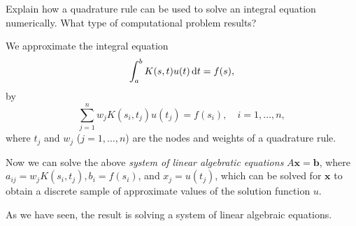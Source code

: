 \begin{pro}
  Explain how a quadrature rule can be used
  to solve an integral equation numerically.
  What type of computational problem results?
\end{pro}

\begin{sol}
  We approximate the integral equation
  \begin{displaymath}
    \int_a^bK(s, t)u(t)\,\mathrm{d} t = f(s),
  \end{displaymath}
  by
  \begin{displaymath}
    \sum_{j=1}^nw_jK(s_i, t_j)u(t_j) = f(s_i), \quad i = 1, \ldots, n,
  \end{displaymath}
  where $t_j$ and $w_j$ ($j=1, \ldots,n$) are the nodes and
  weights of a quadrature rule.

  Now we can solve the above
  \emph{system of linear algebratic equations}
  $A\mathbf{x}=\mathbf{b}$,
  where $a_{ij} = w_jK(s_i, t_j), b_i=f(s_i)$,
  and $x_j=u(t_j)$,
  which can be solved for $\mathbf{x}$ to obtain
  a discrete sample of approximate values of the solution function $u$.

  As we have seen,
  the result is solving a system of linear algebraic equations.
\end{sol}
